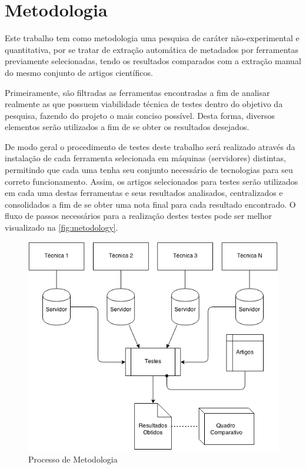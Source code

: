 
\chapter{Metodologia}
\label{cha:metodology}

Este trabalho tem como metodologia uma pesquisa de caráter não-experimental e quantitativa, por se tratar de extração automática de metadados por ferramentas previamente selecionadas, tendo os resultados comparados com a extração manual do mesmo conjunto de artigos científicos.


Primeiramente, são filtradas as ferramentas encontradas a fim de analisar realmente as que possuem viabilidade técnica de testes dentro do objetivo da pesquisa, fazendo do projeto o mais conciso possível. Desta forma, diversos elementos serão utilizados a fim de se obter os resultados desejados.


\begin{textnew}
De modo geral o procedimento de testes deste trabalho será realizado através da instalação de cada ferramenta selecionada em máquinas (servidores) distintas, permitindo que cada uma tenha seu conjunto necessário de tecnologias para seu correto funcionamento. Assim, os artigos selecionados para testes serão utilizados em cada uma destas ferramentas e seus resultados analisados, centralizados e consolidados a fim de se obter uma nota final para cada resultado encontrado. O fluxo de passos necessários para a realização destes testes pode ser melhor visualizado na \autoref{fig:metodology}.
\end{textnew}

\begin{figure}
    \centering
    \caption{Processo de Metodologia}
    \label{fig:metodology}
    \includegraphics[width=0.7\linewidth]{./assets/images/metodology}
\end{figure}


